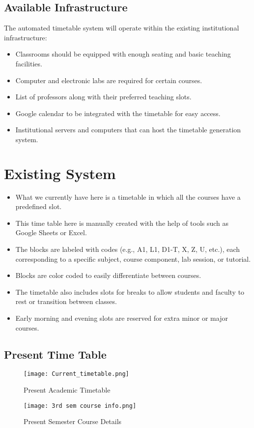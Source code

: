 \documentclass[12pt]{article}
\begin{document}
\subsection{Available Infrastructure}
\large {The automated timetable system will operate within the existing institutional infrastructure: }

\begin{itemize}
    \item \large{Classrooms should be equipped with enough seating and basic teaching facilities.}
    \item \large{Computer and electronic labs are required for certain courses.}
    \item \large{List of professors along with their preferred teaching slots.}
    \item \large{Google calendar to be integrated with the timetable for easy access. }
    \item \large{Institutional servers and computers that can host the timetable generation system.}
\end{itemize}


\newpage

\section{Existing System}
\begin{itemize}
    \item \large{What we currently have here is a timetable in which all the courses have a predefined slot.}
    \item \large{This time table here is manually created with the help of tools such as Google Sheets or Excel.}
    \item \large{The blocks are labeled with codes (e.g., A1, L1, D1-T, X, Z, U, etc.), each corresponding to a specific subject, course component, lab session, or tutorial.}
    \item \large{Blocks are color coded to easily differentiate between courses.}
    \item \large{The timetable also includes slots for breaks to allow students and faculty to rest or transition between classes.}
    \item \large{Early morning and evening slots are reserved for extra minor or major courses.}
\end{itemize}

\subsection{Present Time Table}
\begin{figure}[H]
    \centering
    \texttt{[image: Current\_timetable.png]}
    \caption{Present Academic Timetable}
    \label{fig:placeholder}
\end{figure}
\begin{figure}[H]
    \centering
    \texttt{[image: 3rd sem course info.png]}
    \caption{Present Semester Course Details}
    \label{fig:placeholder}
\end{figure}
\end{document}
